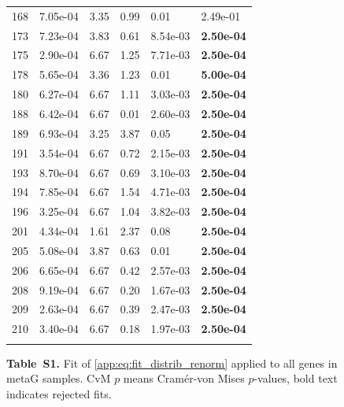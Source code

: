 \begin{figure}[htbp!]
{\begin{minipage}[t]{0.48\linewidth}
\begin{tabular}{llllll}
                    168 & 7.05e-04 & 3.35 & 0.99 & 0.01 & 2.49e-01\\
                    173 & 7.23e-04 & 3.83 & 0.61 & 8.54e-03 & \textbf{2.50e-04}\\
                    175 & 2.90e-04 & 6.67 & 1.25 & 7.71e-03 & \textbf{2.50e-04}\\
                    178 & 5.65e-04 & 3.36 & 1.23 & 0.01 & \textbf{5.00e-04}\\
                    180 & 6.27e-04 & 6.67 & 1.11 & 3.03e-03 & \textbf{2.50e-04}\\
                    188 & 6.42e-04 & 6.67 & 0.01 & 2.60e-03 & \textbf{2.50e-04}\\
                    189 & 6.93e-04 & 3.25 & 3.87 & 0.05 & \textbf{2.50e-04}\\
                    191 & 3.54e-04 & 6.67 & 0.72 & 2.15e-03 & \textbf{2.50e-04}\\
                    193 & 8.70e-04 & 6.67 & 0.69 & 3.10e-03 & \textbf{2.50e-04}\\
                    194 & 7.85e-04 & 6.67 & 1.54 & 4.71e-03 & \textbf{2.50e-04}\\
                    196 & 3.25e-04 & 6.67 & 1.04 & 3.82e-03 & \textbf{2.50e-04}\\
                    201 & 4.34e-04 & 1.61 & 2.37 & 0.08 & \textbf{2.50e-04}\\
                    205 & 5.08e-04 & 3.87 & 0.63 & 0.01 & \textbf{2.50e-04}\\
                    206 & 6.65e-04 & 6.67 & 0.42 & 2.57e-03 & \textbf{2.50e-04}\\
                    208 & 9.19e-04 & 6.67 & 0.20 & 1.67e-03 & \textbf{2.50e-04}\\
                    209 & 2.63e-04 & 6.67 & 0.39 & 2.47e-03 & \textbf{2.50e-04}\\
                    210 & 3.40e-04 & 6.67 & 0.18 & 1.97e-03 & \textbf{2.50e-04}\\
                     &  &  &  &  & \\
        \bottomrule
        \end{tabular}
    \end{minipage}
    }
    \caption*{\textbf{Table~S1.} Fit of \eqref{app:eq:fit_distrib_renorm} applied to all genes in metaG samples. CvM $p$ means Cram\'er-von Mises $p$-values, bold text indicates rejected fits.}
    \label{subtab:app:all:metaG}
\end{figure}